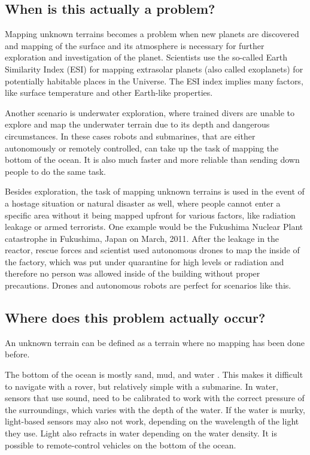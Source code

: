 \subsection{When is this actually a problem?}
Mapping unknown terrains becomes a problem when new planets are discovered and mapping of the surface and its atmosphere is necessary for further exploration and investigation of the planet. Scientists use the so-called Earth Similarity Index (ESI) for mapping extrasolar planets (also called exoplanets) for potentially habitable places in the Universe\cite{exoplanets}\cite{esi}. The ESI index implies many factors, like surface temperature and other Earth-like properties. 

Another scenario is underwater exploration, where trained divers are unable to explore and map the underwater terrain due to its depth and dangerous circumstances. In these cases robots and submarines, that are either autonomously or remotely controlled, can take up the task of mapping the bottom of the ocean. It is also much faster and more reliable than sending down people to do the same task.

Besides exploration, the task of mapping unknown terrains is used in the event of a hostage situation or natural disaster as well, where people cannot enter a specific area without it being mapped upfront for various factors, like radiation leakage or armed terrorists. One example would be the Fukushima Nuclear Plant catastrophe in Fukushima, Japan on March, 2011. After the leakage in the reactor, rescue forces and scientist used autonomous drones to map the inside of the factory\cite{fukushima}, which was put under quarantine for high levels or radiation and therefore no person was allowed inside of the building without proper precautions. Drones and autonomous robots are perfect for scenarios like this.

\clearpage
\subsection{Where does this problem actually occur?}
An unknown terrain can be defined as a terrain where no mapping has been done before.

The bottom of the ocean is mostly sand, mud, and water %
. This makes it difficult to navigate with a rover, but relatively simple with a submarine. In water, sensors that use sound, need to be calibrated to work with the correct pressure of the surroundings, which varies with the depth of the water. If the water is murky, light-based sensors may also not work, depending on the wavelength of the light they use. Light also refracts in water depending on the water density. It is possible to remote-control vehicles on the bottom of the ocean. %

